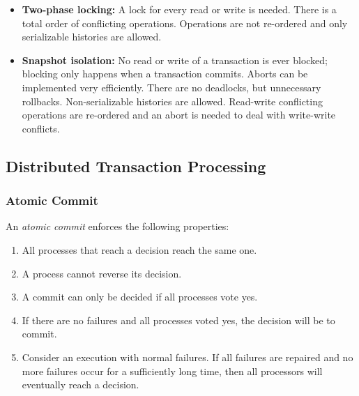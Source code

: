 \begin{itemize}
\item \textbf{Two-phase locking:} A lock for every read or write is needed. There is a total order of conflicting operations. Operations are not re-ordered and only serializable histories are allowed.
\item \textbf{Snapshot isolation:} No read or write of a transaction is ever blocked; blocking only happens when a transaction commits. Aborts can be implemented very efficiently. There are no deadlocks, but unnecessary rollbacks. Non-serializable histories are allowed. Read-write conflicting operations are re-ordered and an abort is needed to deal with write-write conflicts.
\end{itemize}




\subsection{Distributed Transaction Processing}




\subsubsection{Atomic Commit}

An \emph{atomic commit} enforces the following properties:
\begin{enumerate}
\item All processes that reach a decision reach the same one.
\item A process cannot reverse its decision.
\item A commit can only be decided if all processes vote yes.
\item If there are no failures and all processes voted yes, the decision will be to commit.
\item Consider an execution with normal failures. If all failures are repaired and no more failures occur for a sufficiently long time, then all processors will eventually reach a decision.
\end{enumerate}


